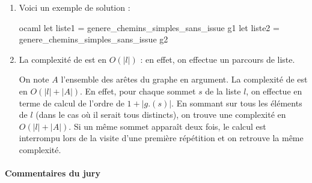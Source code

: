 \documentclass[a4paper, 11pt]{article}
\newenvironment{code-env}
{
  \mdfsetup{
    roundcorner=2pt,
    topline=true,
    leftline=true,
    bottomline=true,
    rightline=true,
    innertopmargin=4pt,
    innerbottommargin=4pt,
    innerrightmargin=4pt,
    innerlinewidth=1pt,
    backgroundcolor={gray!10},
    linecolor={gray!40},
    linewidth=0.1pt,
  }
  \begin{mdframed}[]
  }{\end{mdframed}}
\newenvironment{fancy-code}[1]
  {\VerbatimEnvironment
    \begin{code-env}
    \begin{verbatim}}
 {\end{verbatim}\end{code-env}}
\begin{document}
\begin{enumerate}
\begin{fancy-code}{ocaml}
  (*trouve tous les chemins simples sans issue commençant par s*)
  let rec profondeur s =
    if not visites.(s) then begin
      visites.(s) <- true ;
      chemin_courant_envers := s::(!chemin_courant_envers) ;
      let voisins_libres =
        List.filter (fun x -> not visites.(x)) g.(s)
      in
      if voisins_libres = [] then begin
        liste_chemins := (List.rev !chemin_courant_envers)::(!liste_chemins)
      end else begin
        List.iter profondeur voisins_libres
      end;
      (*pour revenir en arrière *)
      visites.(s) <- false ;
      chemin_courant_envers := List.tl !chemin_courant_envers ;
    end
  in
  for i = 0 to (taille-1) do
    profondeur i
  done ;
  !liste_chemins
    \end{fancy-code}
\item Voici un exemple de solution :
\smallskip
    \begin{fancy-code}{ocaml}
let liste1 = genere_chemins_simples_sans_issue g1
let liste2 = genere_chemins_simples_sans_issue g2
    \end{fancy-code}



\item La complexité de  est en $O(|l|)$ : en effet, on effectue un parcours de liste.

    On note $A$ l'ensemble des arêtes du graphe en argument.
    La complexité de  est en $O(|l|+|A|)$. En effet, pour chaque sommet $s$ de la liste $l$, 
        on effectue en terme de calcul de l'ordre de $1+ |g.(s)|$. En sommant sur tous les 
        éléments de  $l$ (dans le cas où il serait tous distincts), on trouve une complexité en  $O(|l|+|A|)$.
        Si un même sommet apparaît deux fois, le calcul est interrompu lors de la visite d'une première
        répétition et on retrouve la même complexité.

  \end{enumerate}

\paragraph{Commentaires du jury}
\end{document}
